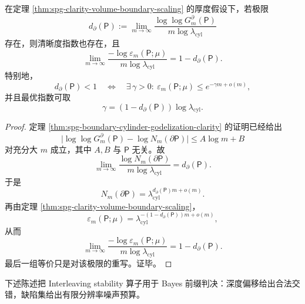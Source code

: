 \begin{corollary}\label{cor:spg-boundary-godel-clarity-exponent-equivalence}
在定理 \ref{thm:spg-clarity-volume-boundary-scaling} 的厚度假设下，若极限
\[
d_\partial(\mathsf P)
:=
\lim_{m\to\infty}
\frac{\log\log G_m^\partial(\mathsf P)}{m\log\lambda_{\mathrm{cyl}}}
\]
存在，则清晰度指数也存在，且
\[
\lim_{m\to\infty}
\frac{-\log \varepsilon_m(\mathsf P;\mu)}{m\log\lambda_{\mathrm{cyl}}}
=
1-d_\partial(\mathsf P).
\]
特别地，
\[
d_\partial(\mathsf P)<1
\quad\Longleftrightarrow\quad
\exists\,\gamma>0:\ 
\varepsilon_m(\mathsf P;\mu)\le e^{-\gamma m+o(m)},
\]
并且最优指数可取
\[
\gamma=(1-d_\partial(\mathsf P))\log\lambda_{\mathrm{cyl}}.
\]
\end{corollary}
\begin{proof}
定理 \ref{thm:spg-boundary-cylinder-godelization-clarity} 的证明已经给出
\[
\bigl|\log\log G_m^\partial(\mathsf P)-\log N_m(\partial\mathsf P)\bigr|
\le
A\log m+B
\]
对充分大 \(m\) 成立，其中 \(A,B\) 与 \(\mathsf P\) 无关。故
\[
\lim_{m\to\infty}
\frac{\log N_m(\partial\mathsf P)}{m\log\lambda_{\mathrm{cyl}}}
=
d_\partial(\mathsf P).
\]
于是
\[
N_m(\partial\mathsf P)
=
\lambda_{\mathrm{cyl}}^{d_\partial(\mathsf P)m+o(m)}.
\]
再由定理 \ref{thm:spg-clarity-volume-boundary-scaling}，
\[
\varepsilon_m(\mathsf P;\mu)
=
\lambda_{\mathrm{cyl}}^{-(1-d_\partial(\mathsf P))m+o(m)},
\]
从而
\[
\lim_{m\to\infty}
\frac{-\log \varepsilon_m(\mathsf P;\mu)}{m\log\lambda_{\mathrm{cyl}}}
=
1-d_\partial(\mathsf P).
\]
最后一组等价只是对该极限的重写。证毕。
\end{proof}
下述陈述把 Interleaving stability 算子用于 Bayes 前缀判决：深度偏移给出合法交错，缺陷集给出有限分辨率噪声预算。
